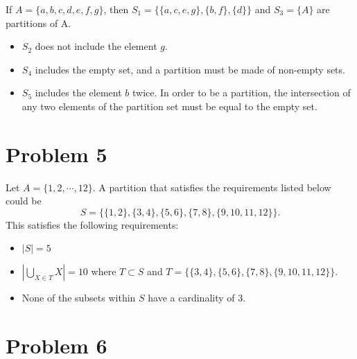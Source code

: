 \documentclass[11pt]{article}
\begin{document}
If $ A = \{a, b, c, d, e, f, g\}$, then $S_1 = \{ \{a, c, e, g\}, \{b, f\}, \{d\} \}$ and $S_3 = \{A\}$ are partitions of A.
\begin{itemize}
    \item $S_2$ does not include the element $g$.
    \item $S_4$ includes the empty set, and a partition must be made of non-empty sets.
    \item $S_5$ includes the element $b$ twice. In order to be a partition, the intersection of any two elements of the partition set must be equal to the empty set.
\end{itemize}

\newpage


\section*{Problem 5}

Let $A = \{1, 2, \cdots, 12\}$. A partition that satisfies the requirements listed below could be
$$ S = \{ \{1, 2\}, \{3, 4\}, \{5, 6\}, \{7, 8\}, \{9, 10, 11, 12\}  \} .$$
This satisfies the following requirements:
\begin{itemize}
    \item $|S| = 5$
    \item $ \left| \mathop{\bigcup}\limits_{X \in T} X \right| = 10 $ where $T \subset S$ and $T = \{\{3, 4\}, \{5, 6\}, \{7, 8\}, \{9, 10, 11, 12\}\}$.\\
    \item None of the subsets within $S$ have a cardinality of 3.\\
\end{itemize}


\newpage


\section*{Problem 6}
\end{document}
